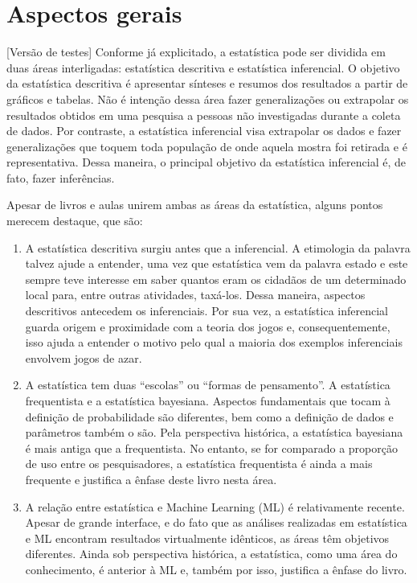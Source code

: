 \documentclass[
]{book}
\begin{document}
\hypertarget{aspectos-gerais}{%
\chapter{Aspectos gerais}\label{aspectos-gerais}}

{[}Versão de testes{]} Conforme já explicitado, a estatística pode ser dividida em duas áreas interligadas: estatística descritiva e estatística inferencial. O objetivo da estatística descritiva é apresentar sínteses e resumos dos resultados a partir de gráficos e tabelas. Não é intenção dessa área fazer generalizações ou extrapolar os resultados obtidos em uma pesquisa a pessoas não investigadas durante a coleta de dados. Por contraste, a estatística inferencial visa extrapolar os dados e fazer generalizações que toquem toda população de onde aquela mostra foi retirada e é representativa. Dessa maneira, o principal objetivo da estatística inferencial é, de fato, fazer inferências.

Apesar de livros e aulas unirem ambas as áreas da estatística, alguns pontos merecem destaque, que são:

\begin{enumerate}
\def\labelenumi{\arabic{enumi}.}
\item
  A estatística descritiva surgiu antes que a inferencial. A etimologia da palavra talvez ajude a entender, uma vez que estatística vem da palavra estado e este sempre teve interesse em saber quantos eram os cidadãos de um determinado local para, entre outras atividades, taxá-los. Dessa maneira, aspectos descritivos antecedem os inferenciais. Por sua vez, a estatística inferencial guarda origem e proximidade com a teoria dos jogos e, consequentemente, isso ajuda a entender o motivo pelo qual a maioria dos exemplos inferenciais envolvem jogos de azar.
\item
  A estatística tem duas ``escolas'' ou ``formas de pensamento''. A estatística frequentista e a estatística bayesiana. Aspectos fundamentais que tocam à definição de probabilidade são diferentes, bem como a definição de dados e parâmetros também o são. Pela perspectiva histórica, a estatística bayesiana é mais antiga que a frequentista. No entanto, se for comparado a proporção de uso entre os pesquisadores, a estatística frequentista é ainda a mais frequente e justifica a ênfase deste livro nesta área.
\item
  A relação entre estatística e Machine Learning (ML) é relativamente recente. Apesar de grande interface, e do fato que as análises realizadas em estatística e ML encontram resultados virtualmente idênticos, as áreas têm objetivos diferentes. Ainda sob perspectiva histórica, a estatística, como uma área do conhecimento, é anterior à ML e, também por isso, justifica a ênfase do livro.
\end{enumerate}
\end{document}
